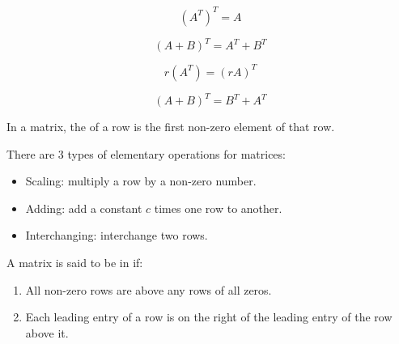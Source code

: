   \hiiEND

      \[
        (A^{T})^{T} = A
      \]

      \[
        (A + B)^{T} = A^{T} + B^{T}
      \]

      \[
        r(A^{T}) = (rA)^{T}
      \]     

      \[
        (A + B)^{T} = B^{T} + A^{T}
      \]
  \hiiEND


    \par In a matrix, the  of a row is the first non-zero
    element of that row.
    \par There are 3 types of elementary operations for matrices:
    \begin{itemize} 
      \item Scaling: multiply a row by a non-zero number.
      \item Adding: add a constant $c$ times one row to another.
      \item Interchanging: interchange two rows.
    \end{itemize} 
    \par A matrix is said to be in  if:
    \begin{enumerate}
      \item All non-zero rows are above any rows of all zeros.
      \item Each leading entry of a row is on the right of the leading entry
        of the row above it.
    \end{enumerate}


